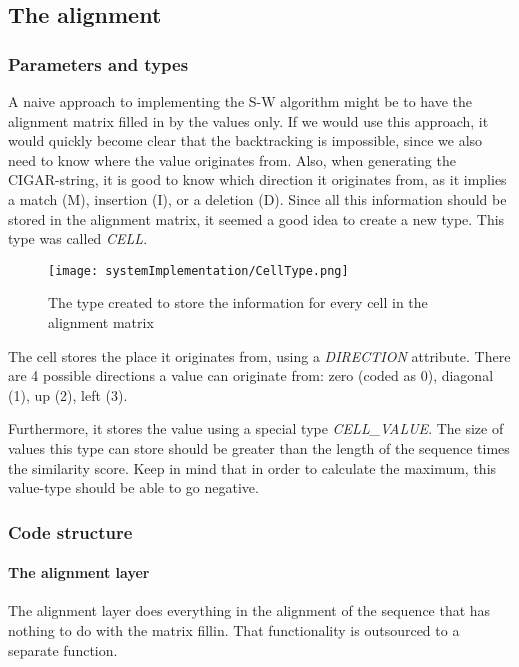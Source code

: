\subsection{The alignment}
\label{expl:alignment}

\subsubsection{Parameters and types}
\label{expl:AlignmentParams}

A naive approach to implementing the S-W algorithm might be to have the alignment matrix filled in by the values only. If we would use this approach, it would quickly become clear that the backtracking is impossible, since we also need to know where the value originates from. Also, when generating the CIGAR-string, it is good to know which direction it originates from, as it implies a match (M), insertion (I), or a deletion (D). Since all this information should be stored in the alignment matrix, it seemed a good idea to create a new type. This type was called \emph{CELL}.

\begin{figure}[H]
	\centering
	\texttt{[image: systemImplementation/CellType.png]}
	\caption{The type created to store the information for every cell in the alignment matrix}
	\label{fig:CellType}
\end{figure}

The cell stores the place it originates from, using a \emph{DIRECTION} attribute. There are 4 possible directions a value can originate from: zero (coded as 0), diagonal (1), up (2), left (3).

Furthermore, it stores the value using a special type \emph{CELL\_VALUE}. The size of values this type can store should be greater than the length of the sequence times the similarity score. Keep in mind that in order to calculate the maximum, this value-type should be able to go negative.

\subsubsection{Code structure}

\paragraph{The alignment layer}

The alignment layer does everything in the alignment of the sequence that has nothing to do with the matrix fillin. That functionality is outsourced to a separate function.

